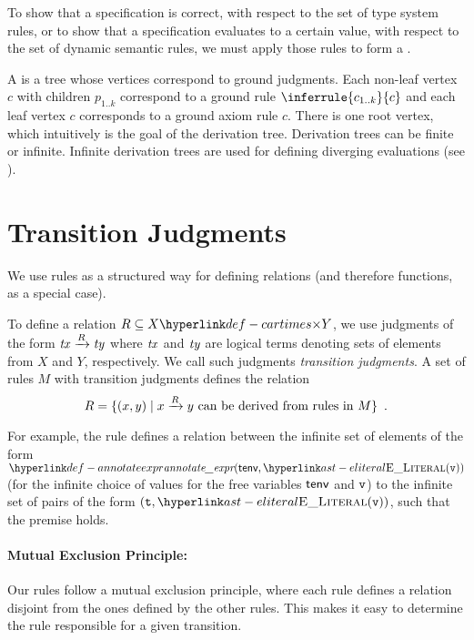To show that a specification is correct, with respect to the set of type system rules,
or to show that a specification evaluates to a certain value, with respect to
the set of dynamic semantic rules, we must apply those rules to form a \emph{\derivationtreeterm}.

\hypertarget{def-derivationtree}{}
\begin{definition}
A \emph{\derivationtreeterm} is a tree whose vertices correspond to ground judgments.
Each non-leaf vertex $c$ with children $p_{1..k}$ correspond to a ground rule
$\inferrule{c_{1..k}}{c}$ and each leaf vertex $c$ corresponds to a ground axiom rule
$c$. There is one root vertex, which intuitively is the goal of the derivation tree.
Derivation trees can be finite or infinite.
Infinite derivation trees are used for defining diverging evaluations
(see ).
\end{definition}

\section{Transition Judgments\label{sec:Transition Judgments}}

We use rules as a structured way for defining relations (and therefore functions, as a special case).

To define a relation $R \subseteq X \cartimes Y$, we use judgments of the form $\mathit{tx} \xrightarrow{R} \mathit{ty}$
where $\mathit{tx}$ and $\mathit{ty}$ are logical terms denoting sets of elements from $X$ and $Y$, respectively.
%
We call such judgments \emph{transition judgments}.
A set of rules $M$ with transition judgments defines the relation
\[
    R = \{ (x,y) \;|\; x \xrightarrow{R} y \text{ can be derived from rules in } M\} \enspace.
\]

For example, the rule  defines a relation
between the infinite set of elements of the form
$\annotateexpr{\tenv, \ELiteral(\vv)}$ (for the
infinite choice of values for the free variables $\textsf{tenv}$ and
$\texttt{v}$) to the infinite set of pairs of the form $(\vt,
\ELiteral(\vv))$, such that the premise holds.

\paragraph{Mutual Exclusion Principle:}
Our rules follow a mutual exclusion principle, where each rule
defines a relation disjoint from the ones defined by the other
rules. This makes it easy to determine the rule responsible
for a given transition.

